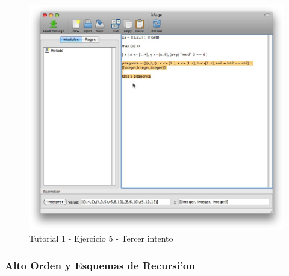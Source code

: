 \documentclass[a4paper]{article}
\begin{document}
\begin{figure}[hp]
	\begin{center}
        	\includegraphics[width=.9\textwidth]{pictures/tut1/05}
		\caption{Tutorial 1 - Ejercicio 5 - Tercer intento}
		\label{tut105}
	\end{center}
\end{figure}

\newpage
\subsubsection{Alto Orden y Esquemas de Recursi'on}
\end{document}

